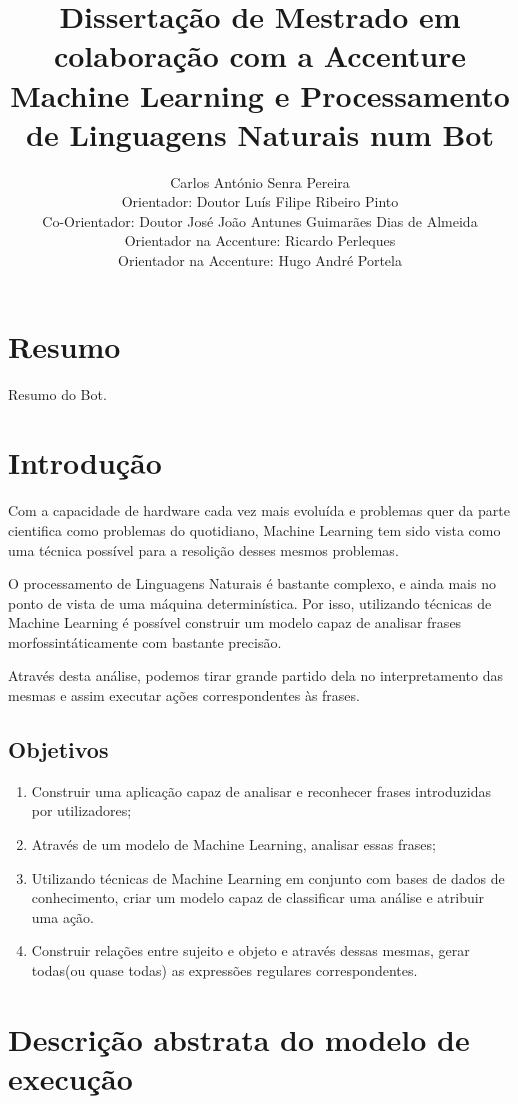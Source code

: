 \documentclass[11pt]{article} %
\title{Dissertação de Mestrado em colaboração com a Accenture \\
\large Machine Learning e Processamento de Linguagens Naturais num Bot}
\author{Carlos António Senra Pereira\\
\small Orientador: Doutor Luís Filipe Ribeiro Pinto\\
\small Co-Orientador: Doutor José João Antunes Guimarães Dias de Almeida\\
\small Orientador na Accenture: Ricardo Perleques\\
\small Orientador na Accenture: Hugo André Portela}
\begin{document}
\maketitle

\tableofcontents

\section{Resumo}

Resumo do Bot.

\section{Introdução}

\hspace{11pt} Com a capacidade de hardware cada vez mais evoluída e problemas quer da parte cientifica como problemas do quotidiano, Machine Learning tem sido vista como uma técnica possível para a resolição desses mesmos problemas.

O processamento de Linguagens Naturais é bastante complexo, e ainda mais no ponto de vista de uma máquina determinística. Por isso, utilizando técnicas de Machine Learning é possível construir um modelo capaz de analisar frases morfossintáticamente com bastante precisão.

Através desta análise, podemos tirar grande partido dela no interpretamento das mesmas e assim executar ações correspondentes às frases.

\subsection{Objetivos}

\begin{enumerate}
\item Construir uma aplicação capaz de analisar e reconhecer frases introduzidas por utilizadores;
\item Através de um modelo de Machine Learning, analisar essas frases;
\item Utilizando técnicas de Machine Learning em conjunto com bases de dados de conhecimento, criar um modelo capaz de classificar uma análise e atribuir uma ação.
\item Construir relações entre sujeito e objeto e através dessas mesmas, gerar todas(ou quase todas) as expressões regulares correspondentes.
\end{enumerate}

\section{Descrição abstrata do modelo de execução}
\end{document}

